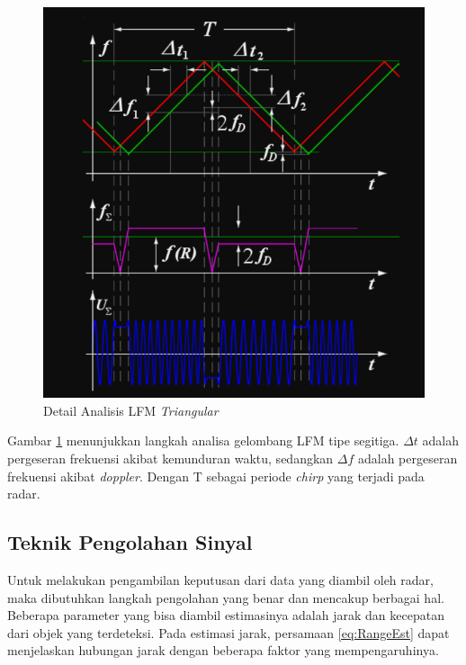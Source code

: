 \begin{figure}
	\begin{center}
		\includegraphics[scale=1]{pics/bab2/DetailMod.png}
		\caption[Detail Analisa LFM \textit{Triangular}]{Detail Analisis LFM \textit{Triangular}}
		\label{pic:DetailMod}
	\end{center}
\end{figure}

Gambar \ref{pic:DetailMod} menunjukkan langkah analisa gelombang LFM tipe segitiga. $\Delta t$ adalah pergeseran frekuensi akibat kemunduran waktu, sedangkan $\Delta f$ adalah pergeseran frekuensi akibat \textit{doppler}. Dengan T sebagai periode \textit{chirp} yang terjadi pada radar.

\subsection{Teknik Pengolahan Sinyal}
Untuk melakukan pengambilan keputusan dari data yang diambil oleh radar, maka dibutuhkan langkah pengolahan yang benar dan mencakup berbagai hal. Beberapa parameter yang bisa diambil estimasinya adalah jarak dan kecepatan dari objek yang terdeteksi. Pada estimasi jarak, persamaan \ref{eq:RangeEst} dapat menjelaskan hubungan jarak dengan beberapa faktor yang mempengaruhinya.

